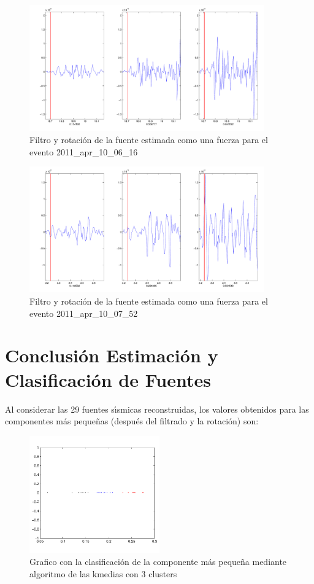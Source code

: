 \begin{figure}[H]
\includegraphics[width=0.9\textwidth,height=0.4\textheight]{linea_timerev/figuras/plotSrcEv28filtrotsrc.pdf}
\caption{Filtro y rotación de la fuente estimada como una fuerza para el
evento 2011\_apr\_10\_06\_16}
\end{figure}
\begin{figure}[H]
\includegraphics[width=0.9\textwidth,height=0.4\textheight]{linea_timerev/figuras/plotSrcEv29filtrotsrc.pdf}
\caption{Filtro y rotación de la fuente estimada como una fuerza para el
evento 2011\_apr\_10\_07\_52}
\end{figure}

\section{Conclusi\'on Estimaci\'on y Clasificaci\'on de Fuentes}

Al considerar las 29 fuentes s\'{\i}smicas reconstruidas, los valores
obtenidos para  las componentes m\'as peque\~nas (despu\'es del filtrado y la
rotaci\'on) son:

\begin{figure}[H]
\centerline{\includegraphics[width=0.5\textwidth]{linea_timerev/figuras/clasificacion.pdf}}
\caption{Grafico con la clasificación de la componente más pequeña mediante
algoritmo de las kmedias con 3 clusters}
\end{figure}

